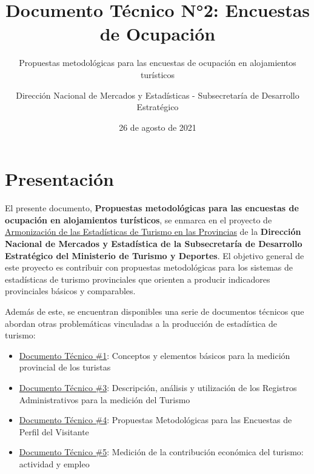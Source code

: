\documentclass[
]{book}
\title{Documento Técnico N°2: Encuestas de Ocupación}
\subtitle{Propuestas metodológicas para las encuestas de ocupación en alojamientos turísticos}
\author{Dirección Nacional de Mercados y Estadísticas - Subsecretaría de Desarrollo Estratégico}
\date{26 de agosto de 2021}
\let\oldmaketitle\maketitle
\begin{document}
\maketitle


\newpage

\let\maketitle\oldmaketitle
\maketitle

{
\setcounter{tocdepth}{1}
\tableofcontents
}
\hypertarget{presentaciuxf3n}{%
\chapter*{Presentación}\label{presentaciuxf3n}}

El presente documento, \textbf{Propuestas metodológicas para las encuestas de ocupación en alojamientos turísticos}, se enmarca en el proyecto de \href{https://armonizacion.yvera.tur.ar//}{Armonización de las Estadísticas de Turismo en las Provincias} de la \textbf{Dirección Nacional de Mercados y Estadística de la Subsecretaría de Desarrollo Estratégico del Ministerio de Turismo y Deportes}. El objetivo general de este proyecto es contribuir con propuestas metodológicas para los sistemas de estadísticas de turismo provinciales que orienten a producir indicadores provinciales básicos y comparables.

Además de este, se encuentran disponibles una serie de documentos técnicos que abordan otras problemáticas vinculadas a la producción de estadística de turismo:

\begin{itemize}
\item
  \href{https://dnme-minturdep.github.io/DT1_medicion_turismo/}{Documento Técnico \#1}: Conceptos y elementos básicos para la medición provincial de los turistas
\item
  \href{https://dnme-minturdep.github.io/DT3_registros_adminsitrativos/}{Documento Técnico \#3}: Descripción, análisis y utilización de los Registros Administrativos para la medición del Turismo
\item
  \href{https://dnme-minturdep.github.io/DT4_perfiles/}{Documento Técnico \#4}: Propuestas Metodológicas para las Encuestas de Perfil del Visitante
\item
  \href{https://dnme-minturdep.github.io/DT5_actividad_empleo/}{Documento Técnico \#5}: Medición de la contribución económica del turismo: actividad y empleo
\end{itemize}
\end{document}
